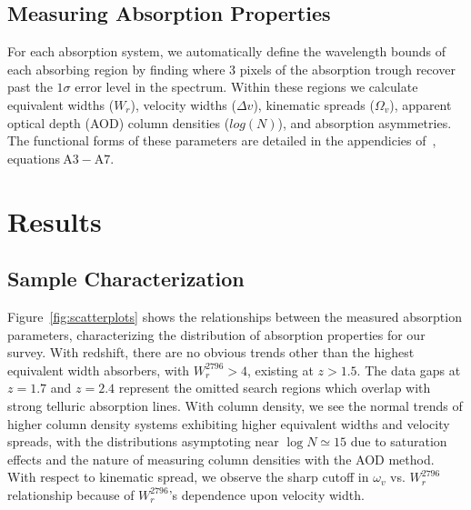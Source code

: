 \documentclass[iop,apj,numberedappendix,appendixfloats,twocolappendix]{emulateapj}
\begin{document}

\subsection{Measuring Absorption Properties}
\label{sec:measuring}

For each absorption system, we automatically define the wavelength bounds of each absorbing region by finding where 3 pixels of the absorption trough recover past the $1\sigma$ error level in the spectrum. Within these regions we calculate equivalent widths ($W_r$), velocity widths ($\Delta v$), kinematic spreads ($\Omega_v$), apparent optical depth (AOD) column densities ($log(N)$), and absorption asymmetries. The functional forms of these parameters are detailed in the appendicies of~\cite{Churchill2001}, equations$~\mathrm{A3 - A7}$.



\section{Results}
\label{sec:results}

\subsection{Sample Characterization}
\label{sec:sample}

\begin{figure*}[bth]
\caption{Correlations between measured absorption properties for survey sample. $\log N$ is the AOD column density, $\omega_v$ is the kinematic spread, $W_r^{2796}$ is the rest frame {} equivalent width, and $z$ is the absorption redshift.}
\label{fig:scatterplots}
\end{figure*}

Figure~\ref{fig:scatterplots} shows the relationships between the measured absorption parameters, characterizing the distribution of absorption properties for our survey. With redshift, there are no obvious trends other than the highest equivalent width absorbers, with $W_r^{2796} > 4$, existing at $z > 1.5$. The data gaps at $z = 1.7$ and $z = 2.4$ represent the omitted search regions which overlap with strong telluric absorption lines. With column density, we see the normal trends of higher column density systems exhibiting higher equivalent widths and velocity spreads, with the distributions asymptoting near $\log N \simeq 15$ due to saturation effects and the nature of measuring column densities with the AOD method. With respect to kinematic spread, we observe the sharp cutoff in $\omega_v$ vs. $W_r^{2796}$ relationship because of $W_r^{2796}$'s dependence upon velocity width. 
\end{document}
